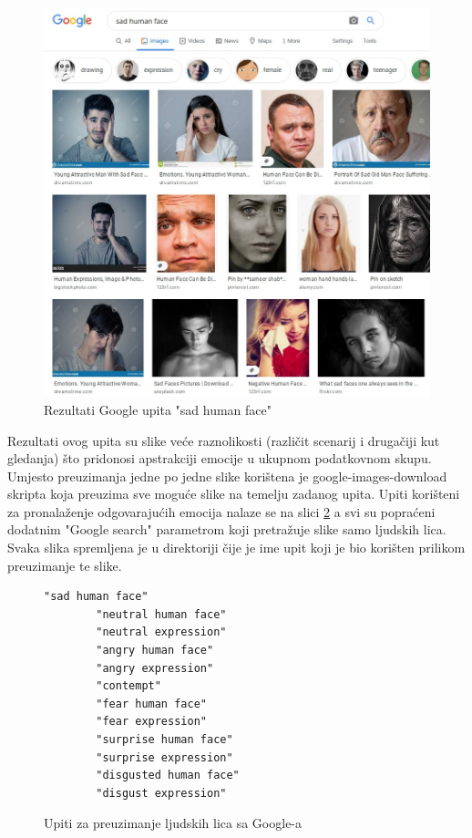 \documentclass[times, utf8, zavrsni,numeric]{fer}
\begin{document}
\begin{figure}[H]
	\includegraphics[width=\linewidth]{2020-06-08-22-16-22.jpeg}
	\caption{Rezultati Google upita "sad human face"}
	\label{pic:google_search_sad}
\end{figure}

Rezultati ovog upita su slike veće raznolikosti (različit scenarij i drugačiji kut gledanja) što pridonosi apstrakciji emocije u ukupnom podatkovnom skupu. Umjesto preuzimanja jedne po jedne slike korištena je google-images-download skripta \cite{google-images-download} koja preuzima sve moguće slike na temelju zadanog upita. Upiti korišteni za pronalaženje odgovarajućih emocija nalaze se na slici \ref{cb:google_queries} a svi su popraćeni dodatnim "Google search" parametrom koji pretražuje slike samo ljudskih lica. Svaka slika spremljena je u direktoriji čije je ime upit koji je bio korišten prilikom preuzimanje te slike. 

\begin{figure}[H]
	\centering
		\begin{Verbatim}[fontsize=\small]
		"sad human face"
		"neutral human face"
		"neutral expression"
		"angry human face"
		"angry expression"
		"contempt"
		"fear human face"
		"fear expression"
		"surprise human face"
		"surprise expression"
		"disgusted human face"
		"disgust expression"
		\end{Verbatim}
	\caption{Upiti za preuzimanje ljudskih lica sa Google-a}
	\label{cb:google_queries}
\end{figure}
\end{document}
